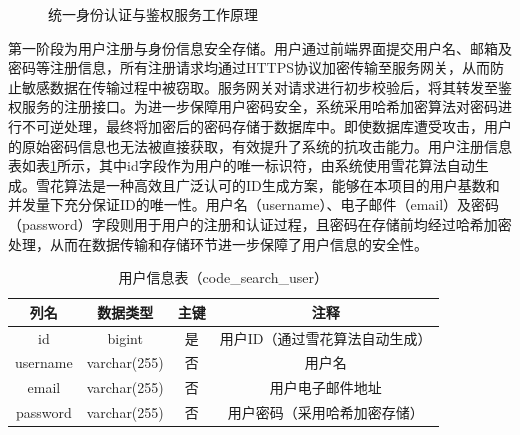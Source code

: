 \documentclass[UTF8,a4paper,12pt]{ctexart}
\numberwithin{equation}{section}
\begin{document}
\begin{figure}[H]
	\caption{统一身份认证与鉴权服务工作原理}
	\label{auth_flow}
\end{figure}
第一阶段为用户注册与身份信息安全存储。用户通过前端界面提交用户名、邮箱及密码等注册信息，所有注册请求均通过HTTPS协议加密传输至服务网关，从而防止敏感数据在传输过程中被窃取。服务网关对请求进行初步校验后，将其转发至鉴权服务的注册接口。为进一步保障用户密码安全，系统采用哈希加密算法对密码进行不可逆处理，最终将加密后的密码存储于数据库中。即使数据库遭受攻击，用户的原始密码信息也无法被直接获取，有效提升了系统的抗攻击能力。用户注册信息表如表\ref{usertable}所示，其中id字段作为用户的唯一标识符，由系统使用雪花算法自动生成。雪花算法是一种高效且广泛认可的ID生成方案，能够在本项目的用户基数和并发量下充分保证ID的唯一性。用户名（username）、电子邮件（email）及密码（password）字段则用于用户的注册和认证过程，且密码在存储前均经过哈希加密处理，从而在数据传输和存储环节进一步保障了用户信息的安全性。\par
\begin{table}[H]
	\centering
	\caption{用户信息表（code\_search\_user）}
	\small
	\begin{tabular}{c c c c}
		\toprule
		列名 & 数据类型 & 主键 & 注释\\
		\midrule
		id & bigint & 是 & 用户ID（通过雪花算法自动生成）\\
		username & varchar(255) & 否 & 用户名\\
		email & varchar(255) & 否 & 用户电子邮件地址\\
		password & varchar(255) & 否 & 用户密码（采用哈希加密存储）\\
		\bottomrule
	\end{tabular}
	\label{usertable}
\end{table}
\end{document}
